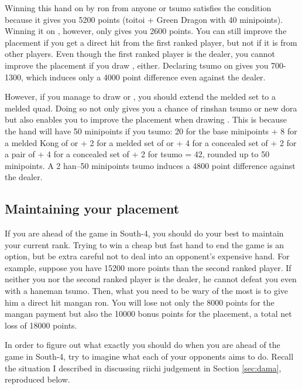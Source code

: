 \bigskip
Winning this hand on {\LARGE\fa} by {\jap ron} from anyone or {\jap tsumo} satisfies the condition because it gives you 5200 points ({\jap toitoi} + Green Dragon with 40 minipoints). Winning it on {\LARGE{}}, however, only gives you 2600 points. You can still improve the placement if you get a direct hit from the first ranked player, but not if it is from other players. Even though the first ranked player is the dealer, you cannot improve the placement if you draw {\LARGE{}}, either. Declaring {\jap tsumo} on {\LARGE{}} gives you 700-1300, which induces only a 4000 point difference even against the dealer. 

\bigskip
However, if you manage to draw {\LARGE{}} or {\LARGE{}}, you should extend the melded set to a melded quad. Doing so not only gives you a chance of {\jap rinshan tsumo} or new {\jap dora} but also enables you to improve the placement when drawing {\LARGE{}}. This is because the hand will have 50 minipoints if you {\jap tsumo}: 20 for the base minipoints + 8 for a melded Kong of {\LARGE{}} or {\LARGE{}} + 2 for a melded set of {\LARGE{}} or {\LARGE{}} + 4 for a concealed set of {\LARGE{}} + 2 for a pair of {\LARGE\fa} + 4 for a concealed set of {\LARGE{}} + 2 for {\jap tsumo} = 42, rounded up to 50 minipoints. A 2 {\jap han}--50 minipoints {\jap tsumo} induces a 4800 point difference against the dealer.

\bigskip
\subsection*{Maintaining your placement}
If you are ahead of the game in South-4, you should do your best to maintain your current rank. Trying to win a cheap but fast hand to end the game is an option, but be extra careful not to deal into an opponent's expensive hand. For example, suppose you have 15200 more points than the second ranked player. If neither you nor the second ranked player is the dealer, he cannot defeat you even with a {\jap haneman tsumo}. Then, what you need to be wary of the most is to give him a direct hit {\jap mangan ron}. You will lose not only the 8000 points for the {\jap mangan} payment but also the 10000 bonus points for the placement, a total net loss of 18000 points.

\bigskip
In order to figure out what exactly you should do when you are ahead of the game in South-4, try to imagine what each of your opponents aims to do. Recall the situation I described in discussing riichi judgement in Section \ref{sec:dama}, reproduced below.

